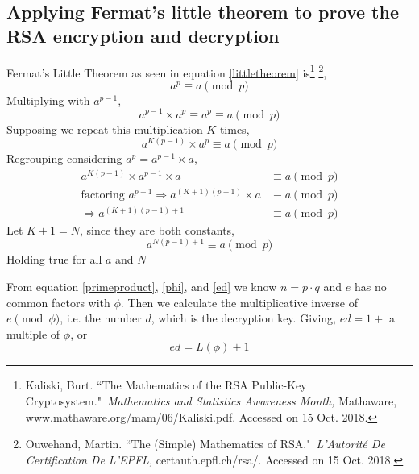 \documentclass[a4paper,12pt]{article}
\theoremstyle{definition}
\begin{document}
\subsection{Applying Fermat's little theorem to prove the RSA encryption and decryption} \label{rsaproof}
Fermat's Little Theorem as seen in equation \ref{littletheorem} is\footnote{Kaliski, Burt. ``The Mathematics of the RSA Public-Key Cryptosystem." \textit{Mathematics and Statistics Awareness Month,} Mathaware, www.mathaware.org/mam/06/Kaliski.pdf. Accessed on 15 Oct. 2018.} \footnote{Ouwehand, Martin. ``The (Simple) Mathematics of RSA." \textit{L'Autorité De Certification De L'EPFL,} certauth.epfl.ch/rsa/. Accessed on 15 Oct. 2018.},
\begin{equation}
	a^p \equiv a \pmod p
\end{equation}
Multiplying with $a^{p-1}$,
\begin{equation}
	a^{p-1} \times a^p \equiv a^p \equiv a \pmod p
\end{equation}
Supposing we repeat this multiplication $K$ times,
\begin{equation}
	a^{K(p-1)} \times a^p \equiv a \pmod p
\end{equation}
Regrouping considering $a^p = a^{p-1} \times a$,
\begin{equation}
\begin{split}
	a^{K(p-1)} \times a^{p-1} \times a & \equiv a \pmod p \\
\text{factoring $a^{p-1}$}	\Rightarrow a^{(K+1)(p-1)} \times a &\equiv a \pmod p \\
	\Rightarrow a^{(K+1)(p-1)+1} & \equiv a \pmod p 
\end{split}
\end{equation}
Let $K+1 = N$, since they are both constants,
\begin{equation} 
	a^{N(p-1)+1} \equiv a \pmod p
\end{equation}
Holding true for all $a$ and $N$

From equation \ref{primeproduct}, \ref{phi}, and \ref{ed} we know  $n = p \cdot q$ and $e$ has no common factors with $\phi$. Then we calculate the multiplicative inverse of $e \pmod{\phi}$, i.e. the number $d$, which is the decryption key. Giving, $ed = 1 +$ a multiple of $\phi$, or 
\begin{equation} \label{fermatslittle2}
	ed = L(\phi) +1
\end{equation}
\end{document}
